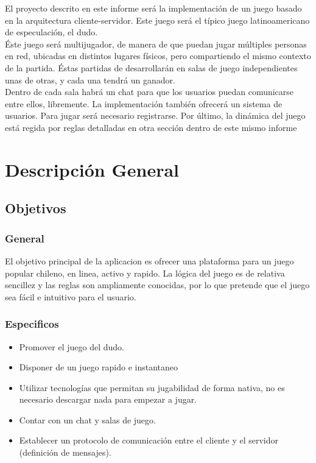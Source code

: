 \documentclass[a4paper,11pt]{article}
\begin{document}
	El proyecto descrito en este informe será la implementación de
un juego basado en la  arquitectura cliente-servidor. Este juego será 
el típico juego latinoamericano de especulación, el dudo.\\

	Éste juego será multijugador, de manera de que puedan jugar múltiples 
personas en red, ubicadas en distintos lugares físicos, pero compartiendo el
mismo contexto de la partida. Éstas partidas de desarrollarán en salas de 
juego independientes unas de otras, y cada una tendrá un ganador. \\
	
	Dentro de cada sala habrá un chat para que los usuarios puedan 
comunicarse entre ellos, libremente.
	La implementación también ofrecerá un sistema de usuarios. Para jugar
será necesario registrarse. Por último, la dinámica del juego está regida por 
reglas detalladas en otra sección dentro de este mismo informe 

\newpage
\section{Descripción General}
\subsection{Objetivos}
\subsubsection{General}

	El objetivo principal de la aplicacion es ofrecer una plataforma para
un juego popular chileno, en linea, activo y rapido. La lógica del juego
es de relativa sencillez y las reglas son ampliamente conocidas, por lo que
pretende que el juego sea fácil e intuitivo para el usuario.

 
\subsubsection{Especificos}
\begin{itemize}
	\item Promover el juego del dudo.
	\item Disponer de un juego rapido e instantaneo
	\item Utilizar tecnologías que permitan su jugabilidad de forma nativa,
	no es necesario descargar nada para empezar a jugar.
	\item Contar con un chat y salas de juego.
	\item Establecer un protocolo de comunicación entre el cliente y el servidor (definición de mensajes).
\end{itemize}
\end{document}
